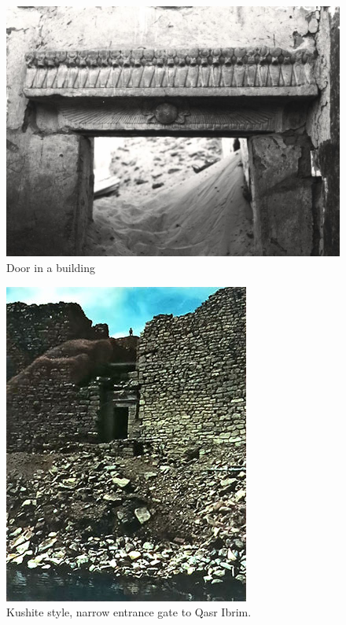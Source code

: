 \documentclass[a4paper,12pt]{scrreprt}
\begin{document}
\begin{figure}[H]
	\centering
	\includegraphics[width=\textwidth]{img/doors/stone_door}
	\caption{Door in a building}
\end{figure}

\begin{figure}[H]
	\centering
	\includegraphics[width=\textwidth]{img/doors/fortress_door}
	\caption{Kushite style, narrow entrance gate to Qasr Ibrim.}
\end{figure}
\end{document}
